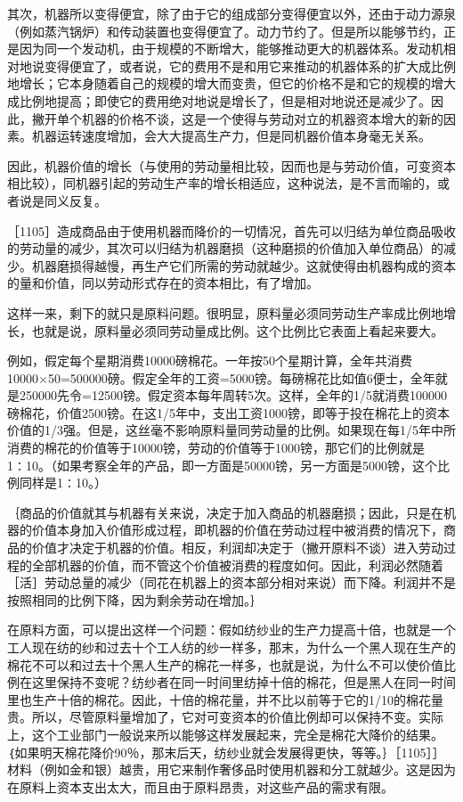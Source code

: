 其次，机器所以变得便宜，除了由于它的组成部分变得便宜以外，还由于动力源泉（例如蒸汽锅炉）和传动装置也变得便宜了。动力节约了。但是所以能够节约，正是因为同一个发动机，由于规模的不断增大，能够推动更大的机器体系。发动机相对地说变得便宜了，或者说，它的费用不是和用它来推动的机器体系的扩大成比例地增长；它本身随着自己的规模的增大而变贵，但它的价格不是和它的规模的增大成比例地提高；即使它的费用绝对地说是增长了，但是相对地说还是减少了。因此，撇开单个机器的价格不谈，这是一个使得与劳动对立的机器资本增大的新的因素。机器运转速度增加，会大大提高生产力，但是同机器价值本身毫无关系。

因此，机器价值的增长（与使用的劳动量相比较，因而也是与劳动价值，可变资本相比较），同机器引起的劳动生产率的增长相适应，这种说法，是不言而喻的，或者说是同义反复。

［1105］造成商品由于使用机器而降价的一切情况，首先可以归结为单位商品吸收的劳动量的减少，其次可以归结为机器磨损（这种磨损的价值加入单位商品）的减少。机器磨损得越慢，再生产它们所需的劳动就越少。这就使得由机器构成的资本的量和价值，同以劳动形式存在的资本相比，有了增加。

这样一来，剩下的就只是原料问题。很明显，原料量必须同劳动生产率成比例地增长，也就是说，原料量必须同劳动量成比例。这个比例比它表面上看起来要大。

例如，假定每个星期消费10000磅棉花。一年按50个星期计算，全年共消费10000×50=500000磅。假定全年的工资=5000镑。每磅棉花比如值6便士，全年就是250000先令=12500镑。假定资本每年周转5次。这样，全年的1/5就消费100000磅棉花，价值2500镑。在这1/5年中，支出工资1000镑，即等于投在棉花上的资本价值的1/3强。但是，这丝毫不影响原料量同劳动量的比例。如果现在每1/5年中所消费的棉花的价值等于10000镑，劳动的价值等于1000镑，那它们的比例就是1∶10。（如果考察全年的产品，即一方面是50000镑，另一方面是5000镑，这个比例同样是1∶10。）

｛商品的价值就其与机器有关来说，决定于加入商品的机器磨损；因此，只是在机器的价值本身加入价值形成过程，即机器的价值在劳动过程中被消费的情况下，商品的价值才决定于机器的价值。相反，利润却决定于（撇开原料不谈）进入劳动过程的全部机器的价值，而不管这个价值被消费的程度如何。因此，利润必然随着［活］劳动总量的减少（同花在机器上的资本部分相对来说）而下降。利润并不是按照相同的比例下降，因为剩余劳动在增加。｝

在原料方面，可以提出这样一个问题：假如纺纱业的生产力提高十倍，也就是一个工人现在纺的纱和过去十个工人纺的纱一样多，那末，为什么一个黑人现在生产的棉花不可以和过去十个黑人生产的棉花一样多，也就是说，为什么不可以使价值比例在这里保持不变呢？纺纱者在同一时间里纺掉十倍的棉花，但是黑人在同一时间里也生产十倍的棉花。因此，十倍的棉花量，并不比以前等于它的1/10的棉花量贵。所以，尽管原料量增加了，它对可变资本的价值比例却可以保持不变。实际上，这个工业部门一般说来所以能够这样发展起来，完全是棉花大降价的结果。｛如果明天棉花降价90％，那末后天，纺纱业就会发展得更快，等等。｝［1105］］材料（例如金和银）越贵，用它来制作奢侈品时使用机器和分工就越少。这是因为在原料上资本支出太大，而且由于原料昂贵，对这些产品的需求有限。

